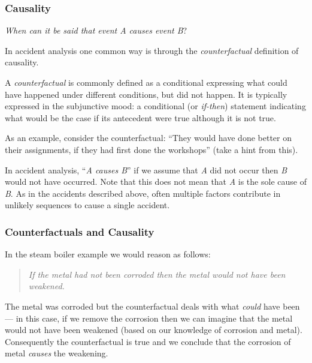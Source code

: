   \subsubsection*{Causality}
  


  {\em When can it be said that event A causes event B}?



  In accident analysis one common way is through the \emph{counterfactual} definition of causality.


 \begin{definition}
  A {\em counterfactual} is commonly defined as a conditional expressing what could have happened under different conditions, but did not happen. It is typically expressed in the
  subjunctive mood: a conditional (or {\em if-then})
  statement indicating what would be the case if its antecedent were
  true although it is not true.
  \end{definition}

  As an example, consider the counterfactual: ``They would have done better on their assignments, if they had first done the workshops'' (take a hint from this).


In accident analysis, ``{\em A causes B}'' if we assume that {\em A}
did not occur then {\em B} would not have occurred. Note that this does not mean that \emph{A} is the sole cause of \emph{B}. As in the accidents described above, often multiple factors contribute in unlikely sequences to cause a single accident.




  \subsubsection*{Counterfactuals and Causality}


  In the steam boiler example we would reason as follows:
  \begin{quote}
    \emph{If the metal had not been corroded then the metal would not have
    been weakened.}
\end{quote}

The metal was corroded but the counterfactual deals with what {\em
  could} have been --- in this case, if we remove the corrosion then
we can imagine that the metal would not have been weakened (based on
our knowledge of corrosion and metal).
Consequently the counterfactual is true and we conclude that the
corrosion of metal {\em causes} the weakening.

